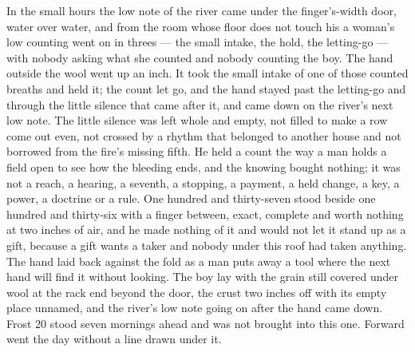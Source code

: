 In the small hours the low note of the river came under the finger's-width door, water over water, and from the room whose floor does not touch his a woman's low counting went on in threes --- the small intake, the hold, the letting-go --- with nobody asking what she counted and nobody counting the boy. The hand outside the wool went up an inch. It took the small intake of one of those counted breaths and held it; the count let go, and the hand stayed past the letting-go and through the little silence that came after it, and came down on the river's next low note. The little silence was left whole and empty, not filled to make a row come out even, not crossed by a rhythm that belonged to another house and not borrowed from the fire's missing fifth. He held a count the way a man holds a field open to see how the bleeding ends, and the knowing bought nothing; it was not a reach, a hearing, a seventh, a stopping, a payment, a held change, a key, a power, a doctrine or a rule. One hundred and thirty-seven stood beside one hundred and thirty-six with a finger between, exact, complete and worth nothing at two inches of air, and he made nothing of it and would not let it stand up as a gift, because a gift wants a taker and nobody under this roof had taken anything. The hand laid back against the fold as a man puts away a tool where the next hand will find it without looking. The boy lay with the grain still covered under wool at the rack end beyond the door, the crust two inches off with its empty place unnamed, and the river's low note going on after the hand came down. Frost 20 stood seven mornings ahead and was not brought into this one. Forward went the day without a line drawn under it.
